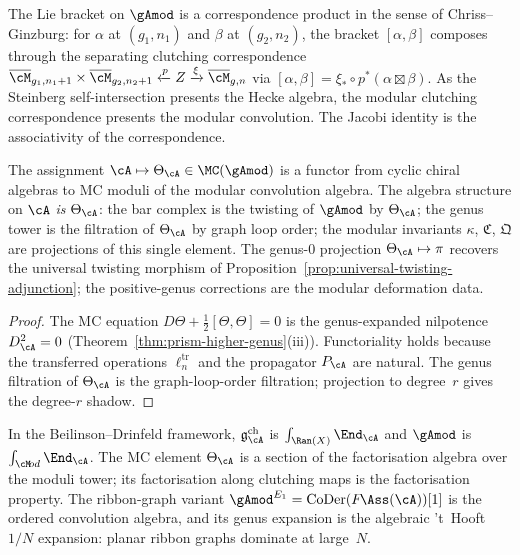 The Lie bracket on $\gAmod$ is a correspondence product in the
sense of Chriss--Ginzburg: for $\alpha$ at $(g_1,n_1)$ and $\beta$
at $(g_2,n_2)$, the bracket $[\alpha,\beta]$ composes through the
separating clutching correspondence
$\overline{\cM}_{g_1,n_1+1} \times
\overline{\cM}_{g_2,n_2+1} \xleftarrow{p} Z \xrightarrow{\xi}
\overline{\cM}_{g,n}$
via $[\alpha,\beta] = \xi_* \circ p^*(\alpha \boxtimes \beta)$.
As the Steinberg self-intersection presents the Hecke algebra, the
modular clutching correspondence presents the modular convolution.
The Jacobi identity is the associativity of the correspondence.

\begin{proposition}
\label{prop:vol1-structure-as-MC}
The assignment $\cA \mapsto \Theta_\cA \in \MC(\gAmod)$
is a functor from cyclic chiral algebras to MC moduli of
the modular convolution algebra.
The algebra structure on $\cA$ \emph{is} $\Theta_\cA$: the bar
complex is the twisting of $\gAmod$ by $\Theta_\cA$; the genus
tower is the filtration of $\Theta_\cA$ by graph loop order;
the modular invariants $\kappa$, $\mathfrak{C}$, $\mathfrak{Q}$
are projections of this single element. The genus-$0$ projection
$\Theta_\cA \mapsto \pi$ recovers the universal twisting morphism
of Proposition~\textup{\ref{prop:universal-twisting-adjunction}};
the positive-genus corrections are the modular deformation data.
\end{proposition}

\begin{proof}
The MC equation $D\Theta + \tfrac{1}{2}[\Theta,\Theta] = 0$ is
the genus-expanded nilpotence $D_\cA^2 = 0$
(Theorem~\ref{thm:prism-higher-genus}(iii)). Functoriality holds
because the transferred operations $\ell_n^{\mathrm{tr}}$ and the
propagator $P_\cA$ are natural. The genus filtration of
$\Theta_\cA$ is the graph-loop-order filtration; projection to
degree~$r$ gives the degree-$r$ shadow.
\end{proof}

\begin{remark}
\label{rem:factoris-homology-vol1}
In the Beilinson--Drinfeld framework, $\mathfrak{g}^{\mathrm{ch}}_\cA$
is $\int_{\Ran(X)} \End_\cA$ and $\gAmod$ is
$\int_{\cM\!od} \End_\cA$. The MC element $\Theta_\cA$ is a
section of the factorisation algebra over the moduli tower;
its factorisation along clutching maps is the factorisation property.
The ribbon-graph variant ${\gAmod}^{E_1} = \operatorname{CoDer}(F\!\Ass(\cA))[1]$
is the ordered convolution algebra, and its genus expansion is the
algebraic 't~Hooft $1/N$ expansion: planar ribbon graphs dominate
at large~$N$.
\end{remark}

